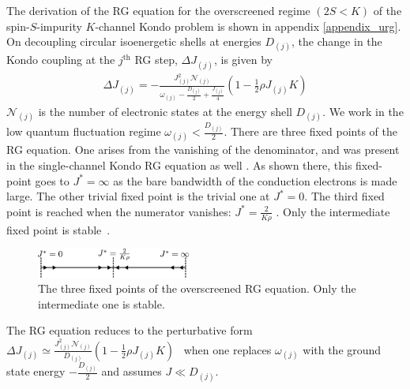 \documentclass[reprint,prb,superscriptaddress]{revtex4-2}
\begin{document}
The derivation of the RG equation for the overscreened regime \((2S < K)\) of the spin-\(S\)-impurity \(K\)-channel Kondo problem is shown in appendix \ref{appendix_urg}. On decoupling circular isoenergetic shells at energies \(D_{(j)}\), the change in the Kondo coupling at the \(j^\text{th}\) RG step, \(\Delta J_{(j)}\), is given by
\begin{equation}\begin{aligned}
	\Delta J_{(j)} = -\frac{J_{(j)}^2 \mathcal{N}_{(j)}}{\omega_{(j)} - \frac{D_{(j)}}{2} + \frac{J_{(j)}}{4}}\left( 1 - \frac{1}{2}\rho J_{(j)} K \right) 
\end{aligned}\end{equation}
\(\mathcal{N}_{(j)}\) is the number of electronic states at the energy shell \(D_{(j)}\). We work in the low quantum fluctuation regime \(\omega_{(j)} < \frac{D_{(j)}}{2}\). There are three fixed points of the RG equation. One arises from the vanishing of the denominator, and was present in the single-channel Kondo RG equation as well \cite{kondo_urg}. As shown there, this fixed-point goes to \(J^* = \infty\) as the bare bandwidth of the conduction electrons is made large. The other trivial fixed point is the trivial one at \(J^* = 0\). The third fixed point is reached when the numerator vanishes: \(J^* = \frac{2}{K \rho}\) \cite{Kogan_2018,Kuramoto1998,Noz_blandin_1980}. Only the intermediate fixed point is stable~\cite{affleck_1991_overscreen,Tsvelick_Weigmann_mchannel_1984,Gan_mchannel_1994,pang_cox_1991,emery_kivelson,vondelft_prl_1998}.
\begin{figure}[htpb]
	\centering
	\includegraphics[width=0.45\textwidth]{./rg_flow.pdf}
	\caption{The three fixed points of the overscreened RG equation. Only the intermediate one is stable.}
	\label{rg_flow}
\end{figure}

The RG equation reduces to the perturbative form \(\Delta J_{(j)} \simeq \frac{J_{(j)}^2 \mathcal{N}_{(j)}}{D_{(j)}}\left( 1 - \frac{1}{2}\rho J_{(j)} K \right)\)~\cite{Kogan_2018,Kuramoto1998,Noz_blandin_1980,tripathi2018landau} when one replaces \(\omega_{(j)}\) with the ground state energy \(-\frac{D_{(j)}}{2}\) and assumes \(J \ll D_{(j)}\).
\end{document}
